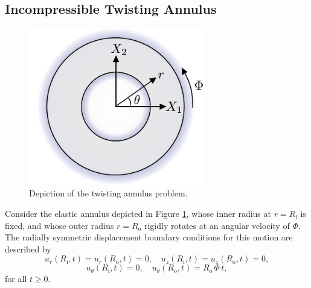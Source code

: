 \subsection*{Incompressible Twisting Annulus}

\begin{figure}[!h]
  \centering
  \includegraphics[width=3.0in]{figures/twisting_annulus_problem.pdf}  		\caption{Depiction of the twisting annulus problem.}
  \label{fig:twisting_annulus_problem}
\end{figure}
Consider the elastic annulus depicted in Figure \ref{fig:twisting_annulus_problem}, whose inner radius at $r = R_{\mathrm i}$ is fixed, and whose outer radius $r = R_{\mathrm o}$ rigidly rotates at an angular velocity of $\Phi$. The radially symmetric displacement boundary conditions for this motion are described by
\begin{equation}
	u_r (R_{\mathrm i},t) = u_r (R_{\mathrm o},t) = 0, \quad u_z (R_{\mathrm i},t) = u_z (R_{\mathrm o},t) = 0,
\end{equation}
\begin{equation}
	u_\theta (R_{\mathrm i},t) = 0, \quad u_\theta (R_{\mathrm o},t) = R_{\mathrm o} \, \Phi \, t,
\end{equation}
for all $t \geq 0$.


